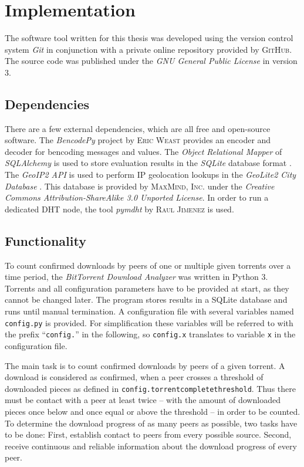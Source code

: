 \documentclass[10pt, a4paper, twoside]{scrartcl}
\renewcommand{\_}{\origunderscore\allowbreak}
\newcommand{\config}[1]{\texttt{config.\allowbreak #1}}
\begin{document}
\section{Implementation}
The software tool written for this thesis was developed using the version control system \emph{Git} \cite{git} in conjunction with a private online repository provided by \textsc{GitHub}. The source code was published \cite{btda} under the \emph{GNU General Public License} in version 3.

\subsection{Dependencies}
There are a few external dependencies, which are all free and open-source software. The \emph{BencodePy} project by \textsc{Eric Weast} \cite{bencodepy} provides an encoder and decoder for bencoding messages and values. The \emph{Object Relational Mapper} of \emph{SQLAlchemy} \cite{sqlalchemy} is used to store evaluation results in the \emph{SQLite} database format \cite{sqlite}. The \emph{GeoIP2 API} \cite{geoip2-api} is used to perform IP geolocation lookups in the \emph{GeoLite2 City Database} \cite{geolite2-db}. This database is provided by \textsc{MaxMind, Inc.} under the \emph{Creative Commons Attribution-ShareAlike 3.0 Unported License}. In order to run a dedicated DHT node, the tool \emph{pymdht} by \textsc{Raul Jimenez} \cite{pymdht} is used.

\subsection{Functionality}
To count confirmed downloads by peers of one or multiple given torrents over a time period, the \emph{BitTorrent Download Analyzer} was written in Python 3. Torrents and all configuration parameters have to be provided at start, as they cannot be changed later. The program stores results in a SQLite database and runs until manual termination. A configuration file with several variables named \texttt{config.py} is provided. For simplification these variables will be referred to with the prefix ``\texttt{config.}'' in the following, so \config{x} translates to variable \texttt{x} in the configuration file.

The main task is to count confirmed downloads by peers of a given torrent. A download is considered as confirmed, when a peer crosses a threshold of downloaded pieces as defined in \config{torrent\_complete\_threshold}. Thus there must be contact with a peer at least twice -- with the amount of downloaded pieces once below and once equal or above the threshold -- in order to be counted. To determine the download progress of as many peers as possible, two tasks have to be done: First, establish contact to peers from every possible source. Second, receive continuous and reliable information about the download progress of every peer.
\end{document}
